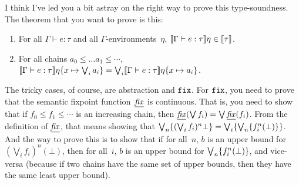 \begin{ndBlockComment}
I think I've led you a bit astray on the right way to prove this
type-soundness.  The theorem that you want to prove is this:
\begin{enumerate}
\item For all $\Gamma\vdash e : \tau$ and all $\Gamma$-environments~$\eta$,
$\llbracket{{\Gamma}\vdash{e}:{\tau}}\rrbracket{\eta}\in\llbracket{\tau}\rrbracket$.
\item For all chains $a_0\leq\dots a_1\leq\dotsb$,
$\llbracket{{\Gamma}\vdash{e}:{\tau}}\rrbracket{\eta\{{x}\mapsto{\bigvee_i a_i}\}} =
\bigvee_i\llbracket{{\Gamma}\vdash{e}:{\tau}}\rrbracket{\eta\{{x}\mapsto{a_i}\}}$.
\end{enumerate}
The tricky cases, of course, are abstraction and $\mathtt{fix}$.  For
$\mathtt{fix}$, you need to prove that the semantic fixpoint function~$\underline{\mathit{fix}}$
is continuous.  That is, you need to show that if $f_0\leq f_1\leq\dotsb$
is an increasing chain, then
$\underline{\mathit{fix}}(\bigvee f_i) = \bigvee\underline{\mathit{fix}}(f_i)$.  From the definition
of $\underline{\mathit{fix}}$, that means showing that
$\bigvee_n\{(\bigvee_i f_i)^n\bot\} =
\bigvee_i\{\bigvee_n\{f_i^n(\bot)\}\}$.  And the way to prove this
is to show that if for all~$n$, $b$ is an upper bound for
$(\bigvee_i f_i)^n(\bot)$, then for all~$i$, $b$ is an upper bound
for $\bigvee_n\{f_i^n(\bot)\}$, and vice-versa (because if two chains
have the same set of upper bounds, then they have the same least upper
bound).
\end{ndBlockComment}

